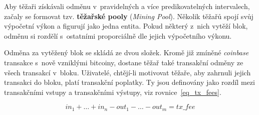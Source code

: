 Aby těžaři získávali odměnu v~pravidelných a více predikovatelných intervalech, začaly se formovat tzv. \textbf{těžařské pooly} (\textit{Mining Pool}). Několik těžařů spojí svůj výpočetní výkon a figurují jako jedna entita. Pokud některý z~nich vytěží blok, odměnu si rozdělí s~ostatními proporciálně dle jejich výpočetního výkonu.

Odměna za vytěžený blok se skládá ze dvou složek. Kromě již zmíněné \textit{coinbase} transakce s~nově vzniklými bitcoiny, dostane těžař také transakční odměny ze všech transakcí v~bloku. Uživatelé, chtějí-li motivovat těžaře, aby zahrnuli jejich transakci do bloku, platí transakční poplatky. Ty jsou definovány jako rozdíl mezi transakčními vstupy a transakčními výstupy, viz rovnice~\ref{eq_tx_fees}.

\begin{equation}
    in_1 + \ldots + in_n - out_1 - \ldots - out_m = tx\_fee
    \label{eq_tx_fees}
\end{equation}

